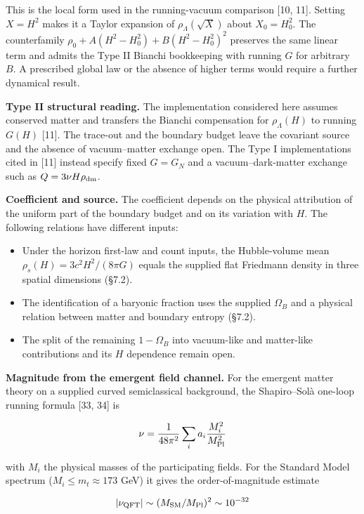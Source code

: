 \documentclass[
]{article}
\providecommand{\tightlist}{%
  \setlength{\itemsep}{0pt}\setlength{\parskip}{0pt}}
\begin{document}
This is the local form used in the running-vacuum comparison {[}10,
11{]}. Setting \(X=H^2\) makes it a Taylor expansion of
\(\rho_\Lambda(\sqrt X)\) about \(X_0=H_0^2\). The counterfamily
\(\rho_0+A(H^2-H_0^2)+B(H^2-H_0^2)^2\) preserves the same linear term
and admits the Type II Bianchi bookkeeping with running \(G\) for
arbitrary \(B\). A prescribed global law or the absence of higher terms
would require a further dynamical result.

\textbf{Type II structural reading.} The implementation considered here
assumes conserved matter and transfers the Bianchi compensation for
\(\rho_\Lambda(H)\) to running \(G(H)\) {[}11{]}. The trace-out and the
boundary budget leave the covariant source and the absence of
vacuum--matter exchange open. The Type I implementations cited in
{[}11{]} instead specify fixed \(G=G_N\) and a vacuum--dark-matter
exchange such as \(Q=3\nu H\rho_{\rm dm}\).

\textbf{Coefficient and source.} The coefficient depends on the physical
attribution of the uniform part of the boundary budget and on its
variation with \(H\). The following relations have different inputs:

\begin{itemize}
\tightlist
\item
  Under the horizon first-law and count inputs, the Hubble-volume mean
  \(\rho_s(H)=3c^2H^2/(8\pi G)\) equals the supplied flat Friedmann
  density in three spatial dimensions (§7.2).
\item
  The identification of a baryonic fraction uses the supplied
  \(\Omega_B\) and a physical relation between matter and boundary
  entropy (§7.2).
\item
  The split of the remaining \(1-\Omega_B\) into vacuum-like and
  matter-like contributions and its \(H\) dependence remain open.
\end{itemize}

\textbf{Magnitude from the emergent field channel.} For the emergent
matter theory on a supplied curved semiclassical background, the
Shapiro--Solà one-loop running formula {[}33, 34{]} is

\[\nu = \frac{1}{48\pi^2}\sum_i a_i \frac{M_i^2}{M_{\rm Pl}^2}\]

with \(M_i\) the physical masses of the participating fields. For the
Standard Model spectrum (\(M_i\leq m_t\approx173\) GeV) it gives the
order-of-magnitude estimate

\[|\nu_{\rm QFT}| \sim (M_{\rm SM}/M_{\rm Pl})^2 \sim 10^{-32}\]
\end{document}
